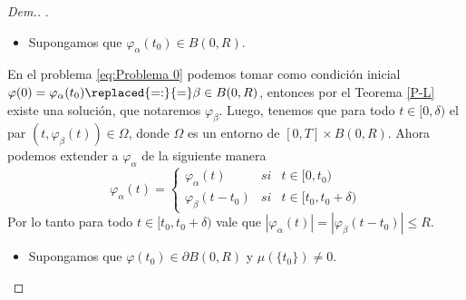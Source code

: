 \begin{proof}[Dem.]
   .%
 		\begin{itemize}
   		\item Supongamos que $\varphi_\alpha(t_0)\in B(0,R)$.
     \end{itemize}
En el problema \eqref{eq:Problema 0} podemos tomar como condición inicial $\varphi(0)=\varphi_\alpha(t_0)\replaced{=:}{=}\beta\in B(0,R)$, entonces por el Teorema \ref{P-L} existe una solución, que  notaremos  $\varphi_{\beta}$. Luego, tenemos que para todo $t\in [0,\delta)$ \normalmarginpar{} el par $(t,\varphi_\beta(t))\in \Omega$, donde  $\Omega$ es un entorno  de $[0,T]\times B(0,R)$. Ahora podemos extender a $\varphi_\alpha $ de la siguiente manera
$$\varphi_\alpha(t)=\left\{\begin{array}{ccc}
    \varphi_\alpha(t) & si &  t\in[0,t_0)\\
     \varphi_\beta(t-t_0) & si &t\in[t_0,t_0+\delta) 
\end{array}\right.$$
Por lo tanto para todo $t\in[t_0,t_0+\delta)$ vale que $|\varphi_\alpha(t)|=|\varphi_\beta(t-t_0)|\leq R$. 

    
    \begin{itemize}
        
    
    \item Supongamos que  $\varphi(t_0)\in \partial B(0,R)$ y $\mu(\{t_0\})\neq 0$.
    

\end{itemize}
\end{proof}
